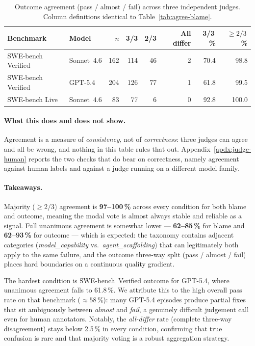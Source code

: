 \documentclass{article}
\begin{document}
\begin{table}[h]
\centering
\caption{Outcome agreement (pass / almost / fail) across three independent judges.
  Column definitions identical to Table~\ref{tab:agree-blame}.}
\label{tab:agree-outcome}
\small
\setlength{\tabcolsep}{6pt}
\renewcommand{\arraystretch}{1.15}
\begin{tabular}{llrrrrrr}
\toprule
Benchmark & Model & $n$ & 3/3 & 2/3 & All differ & 3/3\,\% & ${\geq}2/3$\,\% \\
\midrule
SWE-bench Verified & Sonnet~4.6 & 162 & 114 & 46 & 2 & 70.4 & 98.8 \\
SWE-bench Verified & GPT-5.4    & 204 & 126 & 77 & 1 & 61.8 & 99.5 \\
SWE-bench Live     & Sonnet~4.6 &  83 &  77 &  6 & 0 & 92.8 & 100.0 \\
\bottomrule
\end{tabular}
\end{table}

\paragraph{What this does and does not show.}
Agreement is a measure of \emph{consistency}, not of \emph{correctness}: three
judges can agree and all be wrong, and nothing in this table rules that out.
Appendix~\ref{apdx:judge-human} reports the two checks that do bear on
correctness, namely agreement against human labels and against a judge running
on a different model family.

\paragraph{Takeaways.}
Majority (${\geq}2/3$) agreement is \textbf{97–100\,\%} across every
condition for both blame and outcome, meaning the modal vote is almost
always stable and reliable as a signal.
Full unanimous agreement is somewhat lower — \textbf{62–85\,\%} for blame
and \textbf{62–93\,\%} for outcome — which is expected: the taxonomy
contains adjacent categories (\emph{model\_capability} vs.\
\emph{agent\_scaffolding}) that can legitimately both apply to the same
failure, and the outcome three-way split (pass / almost / fail) places
hard boundaries on a continuous quality gradient.

The hardest condition is SWE-bench~Verified outcome for GPT-5.4, where
unanimous agreement falls to 61.8\,\%.
We attribute this to the high overall pass rate on that benchmark
(${\approx}58\,\%$): many GPT-5.4 episodes produce partial fixes that
sit ambiguously between \emph{almost} and \emph{fail}, a genuinely
difficult judgement call even for human annotators.
Notably, the \emph{all-differ} rate (complete three-way disagreement)
stays below 2.5\,\% in every condition, confirming that true confusion is
rare and that majority voting is a robust aggregation strategy.
\end{document}
